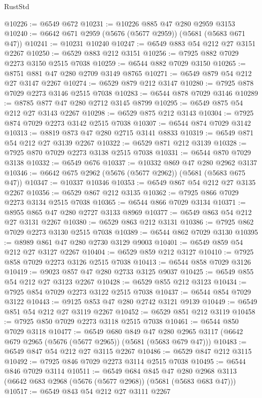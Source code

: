 \begin{lexlean}{RustStd}
\begin{coremodule}
@10226 := @6549 @672
@10231 := @10226 @885 @47 @280 @2959 @3153
@10240 := @6642 @671 @2959 (@5676 (@5677 @2959)) (@5681 (@5683 @671 @47))
@10241 := @10231 @10240
@10247 := @6549 @883 @54 @212 @27 @3151 @2267
@10250 := @6529 @883 @212 @3151
@10256 := @7925 @882 @7029 @2273 @3150 @2515 @7038
@10259 := @6544 @882 @7029 @3150
@10265 := @8751 @881 @47 @280 @2709 @3149 @8765
@10271 := @6549 @879 @54 @212 @27 @3147 @2267
@10274 := @6529 @879 @212 @3147
@10280 := @7925 @878 @7029 @2273 @3146 @2515 @7038
@10283 := @6544 @878 @7029 @3146
@10289 := @8785 @877 @47 @280 @2712 @3145 @8799
@10295 := @6549 @875 @54 @212 @27 @3143 @2267
@10298 := @6529 @875 @212 @3143
@10304 := @7925 @874 @7029 @2273 @3142 @2515 @7038
@10307 := @6544 @874 @7029 @3142
@10313 := @8819 @873 @47 @280 @2715 @3141 @8833
@10319 := @6549 @871 @54 @212 @27 @3139 @2267
@10322 := @6529 @871 @212 @3139
@10328 := @7925 @870 @7029 @2273 @3138 @2515 @7038
@10331 := @6544 @870 @7029 @3138
@10332 := @6549 @676
@10337 := @10332 @869 @47 @280 @2962 @3137
@10346 := @6642 @675 @2962 (@5676 (@5677 @2962)) (@5681 (@5683 @675 @47))
@10347 := @10337 @10346
@10353 := @6549 @867 @54 @212 @27 @3135 @2267
@10356 := @6529 @867 @212 @3135
@10362 := @7925 @866 @7029 @2273 @3134 @2515 @7038
@10365 := @6544 @866 @7029 @3134
@10371 := @8955 @865 @47 @280 @2727 @3133 @8969
@10377 := @6549 @863 @54 @212 @27 @3131 @2267
@10380 := @6529 @863 @212 @3131
@10386 := @7925 @862 @7029 @2273 @3130 @2515 @7038
@10389 := @6544 @862 @7029 @3130
@10395 := @8989 @861 @47 @280 @2730 @3129 @9003
@10401 := @6549 @859 @54 @212 @27 @3127 @2267
@10404 := @6529 @859 @212 @3127
@10410 := @7925 @858 @7029 @2273 @3126 @2515 @7038
@10413 := @6544 @858 @7029 @3126
@10419 := @9023 @857 @47 @280 @2733 @3125 @9037
@10425 := @6549 @855 @54 @212 @27 @3123 @2267
@10428 := @6529 @855 @212 @3123
@10434 := @7925 @854 @7029 @2273 @3122 @2515 @7038
@10437 := @6544 @854 @7029 @3122
@10443 := @9125 @853 @47 @280 @2742 @3121 @9139
@10449 := @6549 @851 @54 @212 @27 @3119 @2267
@10452 := @6529 @851 @212 @3119
@10458 := @7925 @850 @7029 @2273 @3118 @2515 @7038
@10461 := @6544 @850 @7029 @3118
@10477 := @6549
    @680
    @849
    @47
    @280
    @2965
    @3117
    (@6642 @679 @2965 (@5676 (@5677 @2965)) (@5681 (@5683 @679 @47)))
@10483 := @6549 @847 @54 @212 @27 @3115 @2267
@10486 := @6529 @847 @212 @3115
@10492 := @7925 @846 @7029 @2273 @3114 @2515 @7038
@10495 := @6544 @846 @7029 @3114
@10511 := @6549
    @684
    @845
    @47
    @280
    @2968
    @3113
    (@6642 @683 @2968 (@5676 (@5677 @2968)) (@5681 (@5683 @683 @47)))
@10517 := @6549 @843 @54 @212 @27 @3111 @2267

\end{coremodule}
\end{lexlean}
